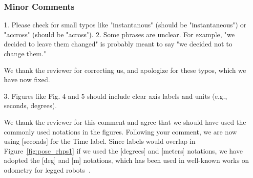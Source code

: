 \subsubsection{Minor Comments}
\begin{revquote}
1. Please check for small typos like "instantanous" (should be "instantaneous") or "accross" (should be "across").
2. Some phrases are unclear. For example, "we decided to leave them changed" is probably meant to say "we decided not to change them."
\end{revquote}

We thank the reviewer for correcting us, and apologize for these typos, which we have now fixed.

\begin{revquote}
3. Figures like Fig. 4 and 5 should include clear axis labels and units (e.g., seconds, degrees).
\end{revquote}

We thank the reviewer for this comment and agree that we should have used the commonly used notations in the figures. Following your comment, we are now using [seconds] for the Time label. Since labels would overlap in Figure~\ref{fig:pose_rhps1} if we used the [degrees] and [meters] notations, we have adopted the [deg] and [m] notations, which has been used in well-known works on odometry for legged robots~\cite{e.g. wisth2022vilens, Lin2005ALegConfigurationMeasSystemHexapod}. 
